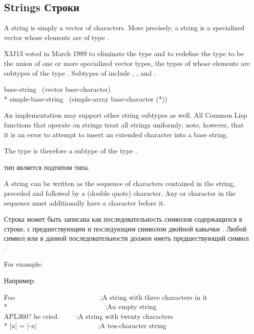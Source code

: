 \subsection{Strings Строки}
\label{STRING-TYPE-SECTION}

\begin{obsolete}
A string is simply a vector of characters.
More precisely, a string is a specialized vector whose elements
are of type .
\end{obsolete}
\begin{newer}
X3J13 voted in March 1989 
to eliminate the type  and to redefine the type
 to be the union of one or more specialized vector
types, the types of whose elements are subtypes of the type .
Subtypes of  include , ,
and .

\vskip 3pt
\begin{lisp}
base-string \EQ\ (vector base-character) \\*
simple-base-string \EQ\ (simple-array base-character (*))
\end{lisp}
An implementation may support
other string subtypes as well.  All Common Lisp functions that operate
on strings treat all strings uniformly; note, however,
that it is an error to attempt to insert
an extended character into a base string.
\end{newer}

\newpage%

The type  is therefore a subtype of the type .

 тип является подтипом  типа.

A string can be written as the sequence of characters contained in the
string, preceded and followed by a \cd{{\Xdquote}} (double quote) character.
Any \cd{{\Xdquote}} or \cd{{\Xbackslash}} character in the sequence must additionally
have a \cd{{\Xbackslash}} character before it.

Строка может быть записана как последовательность символов содержащихся в
строке, с предшествующим и последующим символом двойной кавычки \cd{{\Xdquote}}.
Любой символ \cd{{\Xdquote}} или \cd{{\Xbackslash}} в данной последовательности должен
иметь предшествующий символ \cd{{\Xbackslash}}.

For example:

Например:
\begin{lisp}
{\Xdquote}Foo{\Xdquote}~~~~~~~~~~~~~~~~~~~~~~~~~;\textrm{A string with three characters in it} \\*
{\Xdquote}{\Xdquote}~~~~~~~~~~~~~~~~~~~~~~~~~~~~;\textrm{An empty string} \\
{\Xdquote}{\Xbackslash}{\Xdquote}APL{\Xbackslash}{\Xbackslash}360?{\Xbackslash}{\Xdquote} he cried.{\Xdquote}~~~~~;\textrm{A string with twenty characters} \\*
{\Xdquote}|x| = |-x|{\Xdquote}~~~~~~~~~~~~~~~~~~;\textrm{A ten-character string}
\end{lisp}

